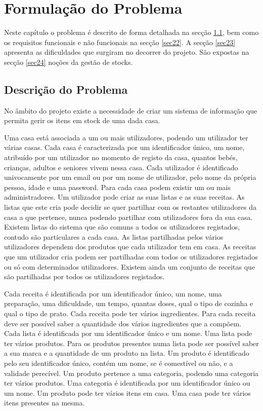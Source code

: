 %
%
\chapter{Formulação do Problema } \label{cap2}

Neste capítulo o problema é descrito de forma detalhada na secção \ref{sec21}, bem como os requisitos funcionais e não funcionais na secção \ref{sec22}. A secção \ref{sec23} apresenta as dificuldades que surgiram no decorrer do projeto. São expostas na secção \ref{sec24} noções da gestão de stocks.


%
%
\section{Descrição do Problema} \label{sec21}
No âmbito do projeto existe a necessidade de criar um sistema de informação que permita gerir os itens em stock de uma dada casa.

Uma casa está associada a um ou mais utilizadores, podendo um utilizador ter várias casas. Cada casa é caracterizada por um identificador único, um nome, atribuído por um utilizador no momento de registo da casa, quantos bebés, crianças, adultos e seniores vivem nessa casa. Cada utilizador é identificado univocamente por um email ou por um nome de utilizador, pelo nome da própria pessoa, idade e uma password. Para cada casa podem existir um ou mais administradores. Um utilizador pode criar as suas listas e as suas receitas. As listas que este cria pode decidir se quer partilhar com os restantes utilizadores da casa a que pertence, nunca podendo partilhar com utilizadores fora da sua casa. Existem listas do sistema que são comuns a todos os utilizadores registados, contudo são particulares a cada casa. As listas partilhadas pelos vários utilizadores dependem dos produtos que cada utilizador tem em casa. As receitas que um utilizador cria podem ser partilhadas com todos os utilizadores registados ou só com determinados utilizadores. Existem ainda um conjunto de receitas que são partilhadas por todos os utilizadores registados.

Cada receita é identificada por um identificador único, um nome, uma preparação, uma dificuldade, um tempo, quantas doses, qual o tipo de cozinha e qual o tipo de prato. Cada receita pode ter vários ingredientes. Para cada receita deve ser possível saber a quantidade dos vários ingredientes que a compõem.
Cada lista é identificada por um identificador único e um nome. Uma lista pode ter vários produtos. Para os produtos presentes numa lista pode ser possível saber a sua marca e a quantidade de um produto na lista. Um produto é identificado pelo seu identificador único, contém um nome, se é comestível ou não, e a validade perecível. Um produto pertence a uma categoria, podendo uma categoria ter vários produtos. Uma categoria é identificada por um identificador único ou um nome. Um produto pode ter vários itens em casa. Uma casa pode ter vários itens presentes na mesma. 

